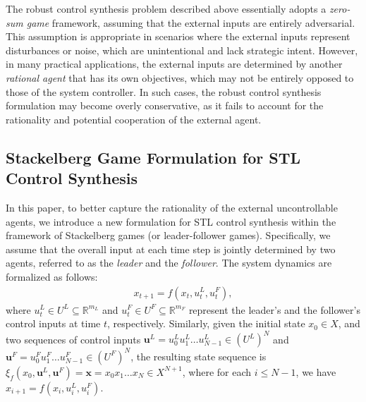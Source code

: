 \documentclass[letterpaper, 10 pt, conference]{ieeeconf}
\begin{document}
The robust control synthesis problem described above essentially adopts a \emph{zero-sum game} framework, assuming that the external inputs are entirely adversarial. This assumption is appropriate in scenarios where the external inputs represent disturbances or noise, which are unintentional and lack strategic intent. However, in many practical applications, the external inputs are determined by another \emph{rational agent} that has its own objectives, which may not be entirely opposed to those of the system controller. In such cases, the robust control synthesis formulation may become overly conservative, as it fails to account for the rationality and potential cooperation of the external agent. 

\subsection{Stackelberg Game Formulation for STL Control Synthesis}
%
In this paper, to better capture the rationality of the external uncontrollable agents, we introduce a new formulation for STL control synthesis within the framework of Stackelberg games (or leader-follower games). Specifically, we assume that the overall input at each time step is jointly determined by two agents, referred to as the \emph{leader} and the \emph{follower}. The system dynamics are formalized as follows:
\begin{align}\label{sys-stack}
    x_{t+1} = f(x_t, u^L_t, u^F_t),
\end{align}
where 
$u^L_t \in U^L \subseteq \mathbb{R}^{m_L}$ and 
$u^F_t \in U^F \subseteq \mathbb{R}^{m_F}$ represent the leader's and the follower's control inputs at time $t$, respectively. 
Similarly, given the initial state $x_0\in X$, and  two sequences of control inputs $\mathbf{u}^L=u^L_0 u^L_{1}\dots u^L_{N-1}\!\!\in \!\!(U^L)^{N}$ and $\mathbf{u}^F=u^F_0 u^F_{1}\dots u^F_{N-1}\!\!\in \!\!(U^F)^{N}$, 
the resulting state sequence is $\xi_f(x_0,\mathbf{u}^L,\mathbf{u}^F)=\mathbf{x}=x_0 x_1\dots x_N\in X^{N+1}$, where for each $ i\leq N-1$, we have $x_{i+1}=f(x_i,u^L_i,u^F_i)$. 
\end{document}
